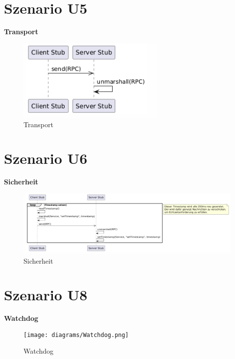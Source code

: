 \section{Szenario U5}
\textbf{Transport}\\
\begin{figure}[h]
	\centering
	\includegraphics[width=0.8\linewidth]{diagrams/Transport.png}
	\caption{Transport}
	\label{fig:Transport}
\end{figure}


\section{Szenario U6}
\textbf{Sicherheit}\\
\begin{figure}[h]
	\centering
	\includegraphics[width=0.8\linewidth]{diagrams/Sicherheit.png}
	\caption{Sicherheit}
	\label{fig:Sicherheit}
\end{figure}



\section{Szenario U8}
\textbf{Watchdog}\\
\begin{figure}[h]
	\centering
	\texttt{[image: diagrams/Watchdog.png]}
	\caption{Watchdog}
	\label{fig:Watchdog}
\end{figure}






